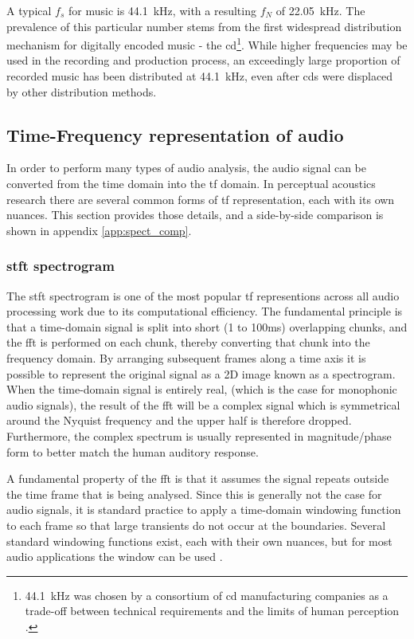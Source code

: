 A typical $f_s$ for music is \qty{44.1}{\kHz}, with a resulting $f_N$ of \qty{22.05}{\kHz}. The prevalence of this particular number stems from the first widespread distribution mechanism for digitally encoded music - the \gls{cd}\footnote{\qty{44.1}{\kHz} was chosen by a consortium of \gls{cd} manufacturing companies as a trade-off between technical requirements and the limits of human perception \cite{baertDigitalAudioCompact2013}.}. While higher frequencies may be used in the recording and production process, an exceedingly large proportion of recorded music has been distributed at \qty{44.1}{\kHz}, even after \glspl{cd} were displaced by other distribution methods.

\subsection{Time-Frequency representation of audio}

In order to perform many types of audio analysis, the audio signal can be converted from the time domain into the \gls{tf} domain. In perceptual acoustics research there are several common forms of \gls{tf} representation, each with its own nuances. This section provides those details, and a side-by-side comparison is shown in appendix \ref{app:spect_comp}.

\subsubsection{\gls{stft} spectrogram}

The \gls{stft} spectrogram is one of the most popular \gls{tf} representions across all audio processing work due to its computational efficiency. The fundamental principle is that a time-domain signal is split into short (1 to 100ms) overlapping chunks, and the \gls{fft} is performed on each chunk, thereby converting that chunk into the frequency domain.  By arranging subsequent frames along a time axis it is possible to represent the original signal as a 2D image known as a spectrogram. When the time-domain signal is entirely real, (which is the case for monophonic audio signals), the result of the \gls{fft} will be a complex signal which is symmetrical around the Nyquist frequency and the upper half is therefore dropped. Furthermore, the complex spectrum is usually represented in magnitude/phase form to better match the human auditory response.

A fundamental property of the \gls{fft} is that it assumes the signal repeats outside the time frame that is being analysed. Since this is generally not the case for audio signals, it is standard practice to apply a time-domain windowing function to each frame so that large transients do not occur at the boundaries. Several standard windowing functions exist, each with their own nuances, but for most audio applications the  window can be used \cite{LibrosastftLibrosa0110}. 

